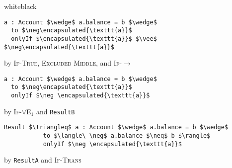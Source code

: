 \begin{minipage}{\linewidth}
\begin{proofBox}{white}{black}
\footnotesize
\begin{minipage}{0.75\textwidth}
\begin{lstlisting}[language = Chainmail, mathescape=true, frame=single]
a : Account $\wedge$ a.balance = b $\wedge$ 
  to $\neg\encapsulated{\texttt{a}}$ 
  onlyIf $\encapsulated{\texttt{a}}$ $\vee$ $\neg\encapsulated{\texttt{a}}$
\end{lstlisting}
\end{minipage}
\begin{minipage}{0.24\textwidth}
\scriptsize
\hfill by \textsc{If-True}, \textsc{Excluded Middle}, and \textsc{If}-$\longrightarrow$
\end{minipage}
\begin{minipage}{0.75\textwidth}
\begin{lstlisting}[language = Chainmail, mathescape=true]
a : Account $\wedge$ a.balance = b $\wedge$ 
  to $\neg\encapsulated{\texttt{a}}$  
  onlyIf $\neg \encapsulated{\texttt{a}}$
\end{lstlisting}
\end{minipage}
\begin{minipage}{0.24\textwidth}
\scriptsize
\hfill by \textsc{If}-$\vee$\textsc{E}$_1$ and \texttt{ResultB}
\end{minipage}
\begin{minipage}{0.75\textwidth}
\begin{lstlisting}[language = Chainmail, mathescape=true, frame=none]
Result $\triangleq$ a : Account $\wedge$ a.balance = b $\wedge$ 
           to $\langle\ \neg$ a.balance $\neq$ b $\rangle$ 
           onlyIf $\neg \encapsulated{\texttt{a}}$
\end{lstlisting}
\end{minipage}
\begin{minipage}{0.24\textwidth}
\scriptsize
\hfill by \texttt{ResultA} and \textsc{If-Trans}
\end{minipage}
\end{proofBox}
\end{minipage}

